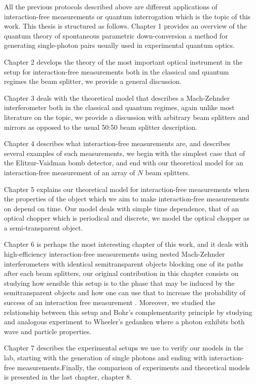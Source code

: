 \documentclass[12pt]{book}
\begin{document}
\thispagestyle{plain}
All the previous protocols described above are different applications of interaction-free measurements or quantum interrogation which is the topic of this work. This thesis is structured as follows. Chapter 1 provides an overview of the quantum theory of spontaneous parametric down-conversion  a method for generating single-photon pairs usually used in experimental quantum optics.

Chapter 2 develops the theory of the most important optical instrument in the setup for interaction-free measurements both in the classical and quantum regimes the beam splitter, we provide a general discussion. 

Chapter 3 deals with the theoretical model that describes a Mach-Zehnder interferometer both in the classical and quantum regimes, again unlike most literature on the topic, we provide a discussion with arbitrary beam splitters and mirrors as opposed to the usual 50:50 beam splitter description.

Chapter 4 describes what interaction-free measurements are, and describes several examples of such measurements, we begin with the simplest case that of the Elitzur-Vaidman bomb detector, and end with our theoretical model for an interaction-free measurement of an array of $N$ beam splitters.

Chapter 5 explains our theoretical model for interaction-free measurements when the properties of the object which we aim to make interaction-free measurements on depend on time. Our model deals with simple time dependence, that of an optical chopper which is periodical and discrete, we model the optical chopper as a semi-transparent object.

Chapter 6 is perhaps the most interesting chapter of this work, and it deals with high-efficiency interaction-free measurements using nested Mach-Zehnder interferometers with identical semitransparent objects blocking one of its paths after each beam splitters, our original contribution in this chapter consists on studying how sensible this setup is to the phase that may be induced by the semitransparent objects and how one can use that to increase the probability of success of an interaction free measurement . Moreover, we studied the relationship between this setup and Bohr's complementarity principle by studying and analogous experiment to Wheeler's gedanken where a photon exhibits both wave and particle properties.

Chapter 7 describes the experimental setups we use to verify our models in the lab, starting with the generation of single photons and ending with interaction-free measurements.Finally, the comparison of experiments and theoretical models is presented in the last chapter, chapter 8.
 
\end{document}
